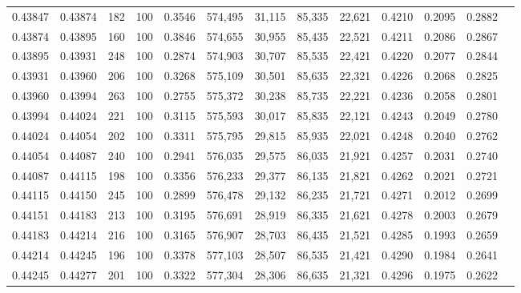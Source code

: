 \begin{tabular}{rrrrrrrrrrrrr}
0.43847 & 0.43874 &   182 & 100 &                                     0.3546 & 574,495 &  31,115 &  85,335 &  22,621 & 0.4210 & 0.2095 & 0.2882 \\
0.43874 & 0.43895 &   160 & 100 &                                     0.3846 & 574,655 &  30,955 &  85,435 &  22,521 & 0.4211 & 0.2086 & 0.2867 \\
0.43895 & 0.43931 &   248 & 100 &                                     0.2874 & 574,903 &  30,707 &  85,535 &  22,421 & 0.4220 & 0.2077 & 0.2844 \\
0.43931 & 0.43960 &   206 & 100 &                                     0.3268 & 575,109 &  30,501 &  85,635 &  22,321 & 0.4226 & 0.2068 & 0.2825 \\
0.43960 & 0.43994 &   263 & 100 &                                     0.2755 & 575,372 &  30,238 &  85,735 &  22,221 & 0.4236 & 0.2058 & 0.2801 \\
0.43994 & 0.44024 &   221 & 100 &                                     0.3115 & 575,593 &  30,017 &  85,835 &  22,121 & 0.4243 & 0.2049 & 0.2780 \\
0.44024 & 0.44054 &   202 & 100 &                                     0.3311 & 575,795 &  29,815 &  85,935 &  22,021 & 0.4248 & 0.2040 & 0.2762 \\
0.44054 & 0.44087 &   240 & 100 &                                     0.2941 & 576,035 &  29,575 &  86,035 &  21,921 & 0.4257 & 0.2031 & 0.2740 \\
0.44087 & 0.44115 &   198 & 100 &                                     0.3356 & 576,233 &  29,377 &  86,135 &  21,821 & 0.4262 & 0.2021 & 0.2721 \\
0.44115 & 0.44150 &   245 & 100 &                                     0.2899 & 576,478 &  29,132 &  86,235 &  21,721 & 0.4271 & 0.2012 & 0.2699 \\
0.44151 & 0.44183 &   213 & 100 &                                     0.3195 & 576,691 &  28,919 &  86,335 &  21,621 & 0.4278 & 0.2003 & 0.2679 \\
0.44183 & 0.44214 &   216 & 100 &                                     0.3165 & 576,907 &  28,703 &  86,435 &  21,521 & 0.4285 & 0.1993 & 0.2659 \\
0.44214 & 0.44245 &   196 & 100 &                                     0.3378 & 577,103 &  28,507 &  86,535 &  21,421 & 0.4290 & 0.1984 & 0.2641 \\
0.44245 & 0.44277 &   201 & 100 &                                     0.3322 & 577,304 &  28,306 &  86,635 &  21,321 & 0.4296 & 0.1975 & 0.2622 \\

\end{tabular}
